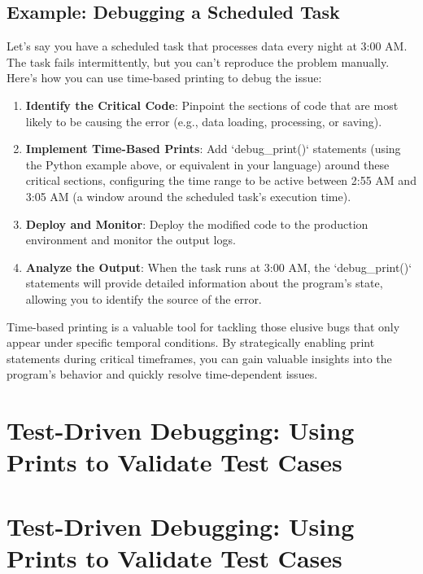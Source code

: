 \documentclass{article}
\begin{document}
{{{{\subsection*{Example: Debugging a Scheduled Task}

Let's say you have a scheduled task that processes data every night at 3:00 AM. The task fails intermittently, but you can't reproduce the problem manually. Here's how you can use time-based printing to debug the issue:

\begin{enumerate}
    \item \textbf{Identify the Critical Code}: Pinpoint the sections of code that are most likely to be causing the error (e.g., data loading, processing, or saving).
    \item \textbf{Implement Time-Based Prints}: Add `debug_print()` statements (using the Python example above, or equivalent in your language) around these critical sections, configuring the time range to be active between 2:55 AM and 3:05 AM (a window around the scheduled task's execution time).
    \item \textbf{Deploy and Monitor}: Deploy the modified code to the production environment and monitor the output logs.
    \item \textbf{Analyze the Output}: When the task runs at 3:00 AM, the `debug_print()` statements will provide detailed information about the program's state, allowing you to identify the source of the error.
\end{enumerate}

Time-based printing is a valuable tool for tackling those elusive bugs that only appear under specific temporal conditions. By strategically enabling print statements during critical timeframes, you can gain valuable insights into the program's behavior and quickly resolve time-dependent issues.

\newpage

\section*{Test-Driven Debugging: Using Prints to Validate Test Cases} %
\label{chapter-5-10-Test-Driven_Debugging__Using_Prints_to_V}

\section*{Test-Driven Debugging: Using Prints to Validate Test Cases}

}}}}
\end{document}
